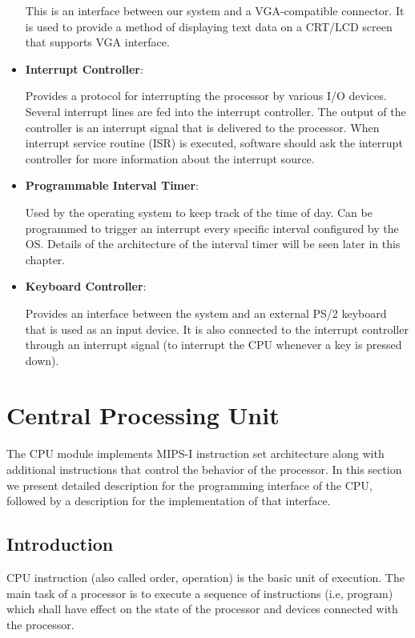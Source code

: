 \documentclass[oneside]{book}
\begin{document}
\begin{itemize}
This is an interface between our system and a VGA-compatible connector.
It is used to provide a method of displaying text data on a CRT/LCD screen
that supports VGA interface.

\item \textbf{Interrupt Controller}:

Provides a protocol for interrupting the processor by various I/O devices.
Several interrupt lines are fed into the interrupt controller. The output
of the controller is an interrupt signal that is delivered to the processor.
When interrupt service routine (ISR) is executed, software should ask
the interrupt controller for more information about the interrupt source.

\item \textbf{Programmable Interval Timer}:

Used by the operating system to keep track of the time of day. Can be
programmed to trigger an interrupt every specific interval configured
by the OS. Details of the architecture of the interval timer will be
seen later in this chapter.

\item \textbf{Keyboard Controller}:

Provides an interface between the system and an external PS/2 keyboard
that is used as an input device. It is also connected to the interrupt
controller through an interrupt signal (to interrupt the CPU whenever
a key is pressed down).

\end{itemize}

\section{Central Processing Unit}

The CPU module implements MIPS-I instruction set architecture along with
additional instructions that control the behavior of the processor. In this
section we present detailed description for the programming interface
of the CPU, followed by a description for the implementation of that
interface.

\subsection{Introduction}

CPU instruction (also called order, operation) is the basic unit
of execution. The main task of a processor is to execute a sequence
of instructions (i.e, program) which shall have effect on the state
of the processor and devices connected with the processor.\\
\end{document}
